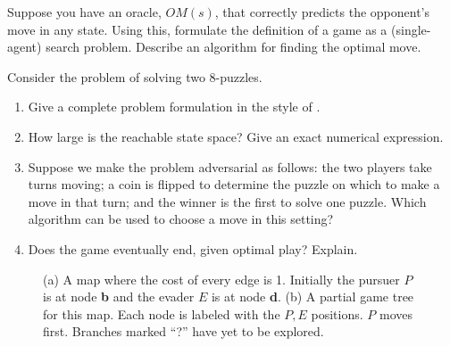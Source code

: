 \setlength{\medskipamount}{1.25\medskipamount}%


\begin{exercise}
Suppose you have an oracle, \(OM(s)\), that correctly predicts the opponent's move
in any state.  Using this, formulate the definition
of a game as a (single-agent) search problem.  Describe an algorithm
for finding the optimal move.
\end{exercise} 

\begin{exercise}%
Consider the problem of solving two 8-puzzles.
\begin{enumerate}
\item Give a complete problem formulation in the style of .
\item How large is the reachable state space? Give an exact numerical expression.
\item Suppose we make the problem adversarial as follows: the two players
take turns moving; a coin is flipped to determine the puzzle on which to make a move in that turn; and the winner is the first to solve one puzzle. 
Which algorithm can be used to choose a move in this setting?
\item Does the game eventually end, given optimal play? Explain.
\end{enumerate}
\end{exercise} 

\begin{figure}[tbp]
\caption{(a) A map where the cost of every edge is 1. Initially the pursuer \(P\) is at
node {\bf b} and the evader \(E\) is at node {\bf d}. (b) A partial game tree for this map.
Each node is labeled with the \(P,E\) positions. \(P\) moves first. Branches marked ``?'' have yet to be explored.}
\label{pursuit-evasion-game-figure}
\end{figure} 

